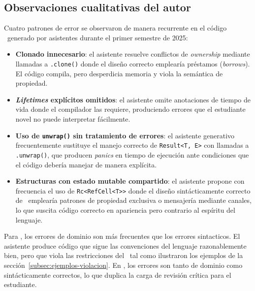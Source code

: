 \subsection{Observaciones cualitativas del autor}
\label{subsec:observaciones-java-rust}

Cuatro patrones de error se observaron de manera recurrente en el código \rust\
generado por asistentes durante el primer semestre de 2025:

\begin{itemize}
  \item \textbf{Clonado innecesario}: el asistente resuelve conflictos de
        \textit{ownership} mediante llamadas a \texttt{.clone()} donde el
        diseño correcto emplearía préstamos (\textit{borrows}). El código
        compila, pero desperdicia memoria y viola la semántica de propiedad.

  \item \textbf{\textit{Lifetimes} explícitos omitidos}: el asistente omite
        anotaciones de tiempo de vida donde el compilador las requiere,
        produciendo errores que el estudiante novel no puede interpretar
        fácilmente.

  \item \textbf{Uso de \texttt{unwrap()} sin tratamiento de errores}:
        el asistente generativo frecuentemente sustituye el manejo
        correcto de \texttt{Result<T, E>} con llamadas a \texttt{.unwrap()},
        que producen \textit{panics} en tiempo de ejecución ante condiciones
        que el código debería manejar de manera explícita.

  \item \textbf{Estructuras con estado mutable compartido}:
        el asistente propone con frecuencia el uso de \texttt{\texttt{Rc\textless RefCell\textless T\textgreater\textgreater}}
        donde el diseño sintácticamente correcto de \rust\ emplearía patrones de propiedad
        exclusiva o mensajería mediante canales, lo que suscita código correcto
        en apariencia pero contrario al espíritu del lenguaje.
        
\end{itemize}

Para \java, los errores de dominio son más frecuentes que los errores sintacticos.
El asistente produce código que sigue las convenciones del lenguaje razonablemente
bien, pero que viola las restricciones del \acuerdo\ tal como ilustraron los
ejemplos de la sección~\ref{subsec:ejemplos-violacion}. En \rust, los errores
son tanto de dominio como sintácticamente correctos, lo que duplica la carga de revisión
crítica para el estudiante.

